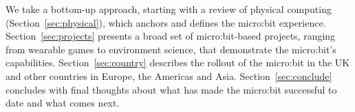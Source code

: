 We take a bottom-up approach, starting with a review of
physical computing (Section~\ref{sec:physical}), which anchors 
and defines the micro:bit experience. Section~\ref{sec:projects}
presents a broad set of micro:bit-based projects, ranging
from wearable games to environment science, that demonstrate
the micro:bit's capabilities.  Section~\ref{sec:country}
describes the rollout of the micro:bit in the UK and other countries
in Europe, the Americas and Asia. Section~\ref{sec:conclude}
concludes with final thoughts about what has made the micro:bit
successful to date and what comes next. 














